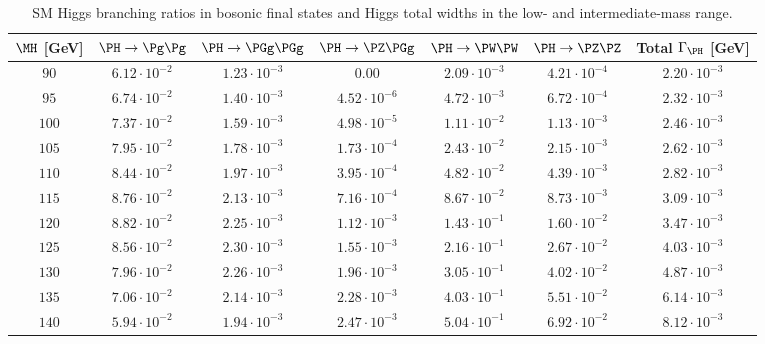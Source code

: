 \begin{table}
  \vspace{-\headsep}
  \caption{SM Higgs branching ratios in bosonic final states and Higgs total widths in the low- and intermediate-mass range.}
  \label{tab:BR-lm.part2}
  \centering
  \small
  \begin{tabular}{ccccccc}\hline
$\MH$ [GeV] & $\PH \rightarrow \Pg\Pg$ & $\PH \rightarrow \PGg \PGg$ & $\PH \rightarrow
\PZ\PGg$ & $\PH \rightarrow \PW\PW$
& $\PH \rightarrow \PZ\PZ$ & Total $\Gamma_{\PH}$ [GeV]\\
\hline
$90 $&$ 6.12\cdot 10^{-2}  $&$ 1.23\cdot 10^{-3}  $&$ 0.00 $&$ 2.09\cdot 10^{-3}  $&$ 4.21\cdot 10^{-4}  $&$ 2.20\cdot 10^{-3}  $\\
$95 $&$ 6.74\cdot 10^{-2}  $&$ 1.40\cdot 10^{-3}  $&$ 4.52\cdot 10^{-6}  $&$ 4.72\cdot 10^{-3}  $&$ 6.72\cdot 10^{-4}  $&$ 2.32\cdot 10^{-3}  $\\
$100 $&$ 7.37\cdot 10^{-2}  $&$ 1.59\cdot 10^{-3}  $&$ 4.98\cdot 10^{-5}  $&$ 1.11\cdot 10^{-2}  $&$ 1.13\cdot 10^{-3}  $&$ 2.46\cdot 10^{-3}  $\\
$105 $&$ 7.95\cdot 10^{-2}  $&$ 1.78\cdot 10^{-3}  $&$ 1.73\cdot 10^{-4}  $&$ 2.43\cdot 10^{-2}  $&$ 2.15\cdot 10^{-3}  $&$ 2.62\cdot 10^{-3}  $\\
$110 $&$ 8.44\cdot 10^{-2}  $&$ 1.97\cdot 10^{-3}  $&$ 3.95\cdot 10^{-4}  $&$ 4.82\cdot 10^{-2}  $&$ 4.39\cdot 10^{-3}  $&$ 2.82\cdot 10^{-3}  $\\
$115 $&$ 8.76\cdot 10^{-2}  $&$ 2.13\cdot 10^{-3}  $&$ 7.16\cdot 10^{-4}  $&$ 8.67\cdot 10^{-2}  $&$ 8.73\cdot 10^{-3}  $&$ 3.09\cdot 10^{-3}  $\\
$120 $&$ 8.82\cdot 10^{-2}  $&$ 2.25\cdot 10^{-3}  $&$ 1.12\cdot 10^{-3}  $&$ 1.43\cdot 10^{-1}  $&$ 1.60\cdot 10^{-2}  $&$ 3.47\cdot 10^{-3}  $\\
$125 $&$ 8.56\cdot 10^{-2}  $&$ 2.30\cdot 10^{-3}  $&$ 1.55\cdot 10^{-3}  $&$ 2.16\cdot 10^{-1}  $&$ 2.67\cdot 10^{-2}  $&$ 4.03\cdot 10^{-3}  $\\
$130 $&$ 7.96\cdot 10^{-2}  $&$ 2.26\cdot 10^{-3}  $&$ 1.96\cdot 10^{-3}  $&$ 3.05\cdot 10^{-1}  $&$ 4.02\cdot 10^{-2}  $&$ 4.87\cdot 10^{-3}  $\\
$135 $&$ 7.06\cdot 10^{-2}  $&$ 2.14\cdot 10^{-3}  $&$ 2.28\cdot 10^{-3}  $&$ 4.03\cdot 10^{-1}  $&$ 5.51\cdot 10^{-2}  $&$ 6.14\cdot 10^{-3}  $\\
$140 $&$ 5.94\cdot 10^{-2}  $&$ 1.94\cdot 10^{-3}  $&$ 2.47\cdot 10^{-3}  $&$ 5.04\cdot 10^{-1}  $&$ 6.92\cdot 10^{-2}  $&$ 8.12\cdot 10^{-3}  $\\

\end{tabular}
\end{table}

